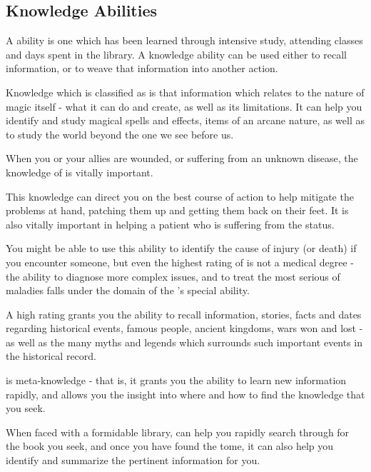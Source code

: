 \subsection{Knowledge Abilities}


A  ability is one which has been learned through intensive study, attending classes and days spent in the library. A knowledge ability can be used either to recall information, or to weave that information into another action. 
	


Knowledge which is classified as  is that information which relates to the nature of magic itself - what it can do and create, as well as its limitations. It can help you identify and study magical spells and effects, items of an arcane nature, as well as to study the world beyond the one we see before us.


When you or your allies are wounded, or suffering from an unknown disease, the knowledge of  is vitally important. 

This knowledge can direct you on the best course of action to help mitigate the problems at hand, patching them up and getting them back on their feet. It is also vitally important in helping a patient who is suffering from the  status. 

You might be able to use this ability to identify the cause of injury (or death) if you encounter someone, but even the highest rating of  is not a medical degree - the ability to diagnose more complex issues, and to treat the most serious of maladies falls under the domain of the 's special  ability.


A high  rating grants you the ability to recall information, stories, facts and dates regarding historical events, famous people, ancient kingdoms, wars won and lost - as well as the many myths and legends which surrounds such important events in the historical record.


 is meta-knowledge - that is, it grants you the ability to learn new information rapidly, and allows you the insight into where and how to find the knowledge that you seek. 

When faced with a formidable library,  can help you rapidly search through for the book you seek, and once you have found the tome, it can also help you identify and summarize the pertinent information for you. 

